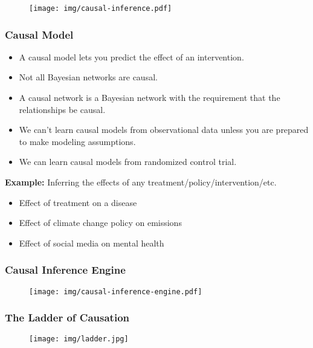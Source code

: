 \documentclass[UTF8,11pt,colorlinks,compress,openany]{beamer}%
\begin{document}
\begin{frame}\frametitle{}
\begin{figure}[H]
\texttt{[image: img/causal-inference.pdf]}	
\end{figure}
\end{frame}

\begin{frame}\frametitle{Causal Model}
\begin{itemize}
	\item A causal model lets you predict the effect of an intervention.
	\item Not all Bayesian networks are causal.
	\item A causal network is a Bayesian network with the requirement that the relationships be causal.
	\item We can't learn causal models from observational data unless you are prepared to make modeling assumptions.
	\item We can learn causal models from randomized control trial.
\end{itemize}
\textbf{Example:} Inferring the effects of any treatment/policy/intervention/etc.
\begin{itemize}
	\item Effect of treatment on a disease
	\item Effect of climate change policy on emissions
	\item Effect of social media on mental health
\end{itemize}
\end{frame}

\begin{frame}\frametitle{Causal Inference Engine}
\begin{figure}[H]
\texttt{[image: img/causal-inference-engine.pdf]}		
\end{figure}	
\end{frame}

\begin{frame}\frametitle{The Ladder of Causation}
\begin{figure}[H]
\texttt{[image: img/ladder.jpg]}	
\end{figure}
\end{frame}
\end{document}
